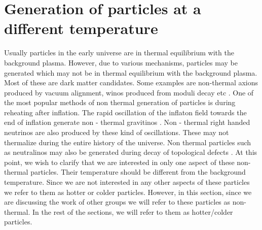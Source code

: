 \documentclass{ws-mpla}
\begin{document}
\section{Generation of particles at a different temperature }
 \label{sec:hotparticle}
Usually particles in the early universe are in thermal equilibrium with the background plasma. However, due to various mechanisms, particles may be generated which 
may not be in thermal equilibrium with the background plasma. Most of these are dark matter candidates. Some examples are non-thermal axions produced by vacuum 
alignment, winos produced from moduli decay etc \cite{acharya}. One of the most popular methods of non thermal generation of particles is during reheating 
after inflation. The rapid oscillation of the inflaton field towards the end of inflation generate non - thermal gravitinos \cite{giudice}. 
Non - thermal right handed neutrinos are also produced by these kind of oscillations. These may not thermalize during the entire history of the universe. 
Non thermal particles such as neutralinos may also be generated during decay of topological defects \cite{jean}. At this point, we wish to clarify that we 
are interested in only one aspect of these non-thermal particles. Their temperature should be different from the background temperature. Since we 
are not interested in any other aspects of these particles we refer to them as hotter or colder particles. However, in this section, since we are discussing
the work of other groups we will refer to these particles as non-thermal. In the rest of the sections, we will refer to them as hotter/colder particles.
\end{document}
